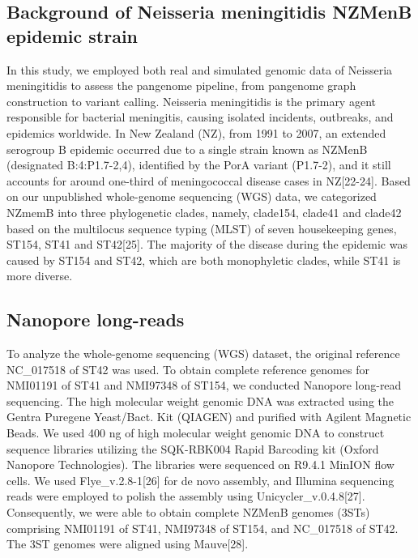 
\subsection{Background of Neisseria meningitidis NZMenB epidemic strain}
In this study, we employed both real and simulated genomic data of Neisseria meningitidis to assess the pangenome pipeline, from pangenome graph construction to variant calling. Neisseria meningitidis is the primary agent responsible for bacterial meningitis, causing isolated incidents, outbreaks, and epidemics worldwide. In New Zealand (NZ), from 1991 to 2007, an extended serogroup B epidemic occurred due to a single strain known as NZMenB (designated B:4:P1.7-2,4), identified by the PorA variant (P1.7-2), and it still accounts for around one-third of meningococcal disease cases in NZ[22-24]. Based on our unpublished whole-genome sequencing (WGS) data, we categorized NZmemB into three phylogenetic clades, namely, clade154, clade41 and clade42 based on the multilocus sequence typing (MLST) of seven housekeeping genes, ST154, ST41 and ST42[25]. The majority of the disease during the epidemic was caused by ST154 and ST42, which are both monophyletic clades, while ST41 is more diverse.
\subsection{Nanopore long-reads}
To analyze the whole-genome sequencing (WGS) dataset, the original reference NC_017518 of ST42 was used. To obtain complete reference genomes for NMI01191 of ST41 and NMI97348 of ST154, we conducted Nanopore long-read sequencing. The high molecular weight genomic DNA was extracted using the Gentra Puregene Yeast/Bact. Kit (QIAGEN) and purified with Agilent Magnetic Beads. We used 400 ng of high molecular weight genomic DNA to construct sequence libraries utilizing the SQK-RBK004 Rapid Barcoding kit (Oxford Nanopore Technologies). The libraries were sequenced on R9.4.1 MinION flow cells. We used Flye_v.2.8-1[26] for de novo assembly, and Illumina sequencing reads were employed to polish the assembly using Unicycler_v.0.4.8[27]. Consequently, we were able to obtain complete NZMenB genomes (3STs) comprising NMI01191 of ST41, NMI97348 of ST154, and NC_017518 of ST42. The 3ST genomes were aligned using Mauve[28].
